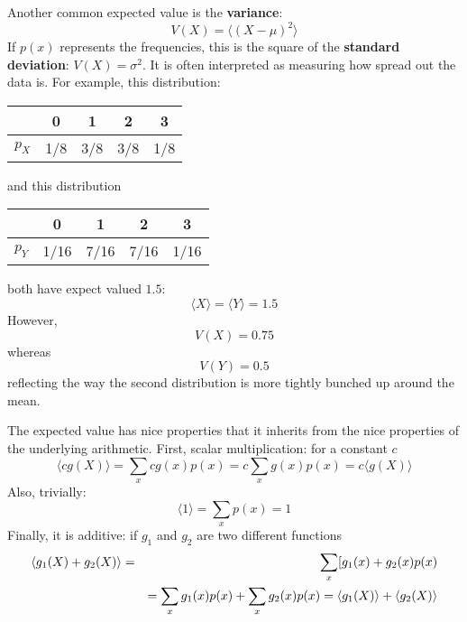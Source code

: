 \documentclass[11pt,a4paper]{scrartcl}
\begin{document}
Another common expected value is the \textbf{variance}:
\begin{equation}
V(X)=\langle (X-\mu)^2\rangle
\end{equation}
If $p(x)$ represents the frequencies, this is the square of the
\textbf{standard deviation}: $V(X)=\sigma^2$. It is often interpreted
as measuring how spread out the data is. For example, this
distribution:
\begin{center}
\begin{tabular}{c|cccc}
&0&1&2&3\\
\hline
$p_X$&1/8&3/8&3/8&1/8
\end{tabular}
\end{center}
and this distribution
\begin{center}
\begin{tabular}{c|cccc}
&0&1&2&3\\
\hline
$p_Y$&1/16&7/16&7/16&1/16
\end{tabular}
\end{center}
both have expect valued $1.5$:
\begin{equation}
\langle X\rangle = \langle Y\rangle = 1.5
\end{equation}
However,
\begin{equation}
V(X)=0.75
\end{equation}
whereas 
\begin{equation}
V(Y)=0.5
\end{equation}
reflecting the way the second distribution is more tightly bunched up
around the mean.

The expected value has nice properties that it inherits from the nice
properties of the underlying arithmetic. First, scalar multiplication:
for a constant $c$
\begin{equation}
\langle c g(X)\rangle =\sum_x cg(x)p(x)=c\sum_x g(x)p(x)=c\langle g(X)\rangle
\end{equation}
Also, trivially:
\begin{equation}
\langle 1\rangle=\sum_x p(x)=1
\end{equation}
Finally, it is additive: if $g_1$ and $g_2$ are two different
functions
\begin{eqnarray}
\langle g_1(X)+g_2(X)\rangle &=&\sum_x [g_1(x)+g_2(x)p(x)\cr
&&=\sum_x g_1(x)p(x)+\sum_x g_2(x)p(x)=\langle g_1(X)\rangle+\langle g_2(X)\rangle
\end{eqnarray}
\end{document}

